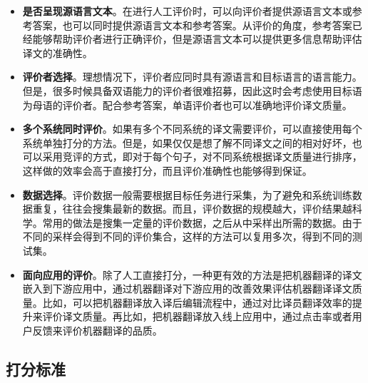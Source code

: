 \begin{itemize}
\vspace{0.5em}
\item {\small\sffamily\bfseries{是否呈现源语言文本}}。在进行人工评价时，可以向评价者提供源语言文本或参考答案，也可以同时提供源语言文本和参考答案。从评价的角度，参考答案已经能够帮助评价者进行正确评价，但是源语言文本可以提供更多信息帮助评估译文的准确性。
\vspace{0.5em}
\item {\small\sffamily\bfseries{评价者选择}}。理想情况下，评价者应同时具有源语言和目标语言的语言能力。但是，很多时候具备双语能力的评价者很难招募，因此这时会考虑使用目标语为母语的评价者。配合参考答案，单语评价者也可以准确地评价译文质量。
\vspace{0.5em}
\item {\small\sffamily\bfseries{多个系统同时评价}}。如果有多个不同系统的译文需要评价，可以直接使用每个系统单独打分的方法。但是，如果仅仅是想了解不同译文之间的相对好坏，也可以采用竞评的方式，即对于每个句子，对不同系统根据译文质量进行排序，这样做的效率会高于直接打分，而且评价准确性也能够得到保证。
\vspace{0.5em}
\item {\small\sffamily\bfseries{数据选择}}。评价数据一般需要根据目标任务进行采集，为了避免和系统训练数据重复，往往会搜集最新的数据。而且，评价数据的规模越大，评价结果越科学。常用的做法是搜集一定量的评价数据，之后从中采样出所需的数据。由于不同的采样会得到不同的评价集合，这样的方法可以复用多次，得到不同的测试集。
\vspace{0.5em}
\item {\small\sffamily\bfseries{面向应用的评价}}。除了人工直接打分，一种更有效的方法是把机器翻译的译文嵌入到下游应用中，通过机器翻译对下游应用的改善效果评估机器翻译译文质量。比如，可以把机器翻译放入译后编辑流程中，通过对比译员翻译效率的提升来评价译文质量。再比如，把机器翻译放入线上应用中，通过点击率或者用户反馈来评价机器翻译的品质。
\vspace{0.5em}
\end{itemize}


\subsection{打分标准} \label{sec:human-eval-scoring}

